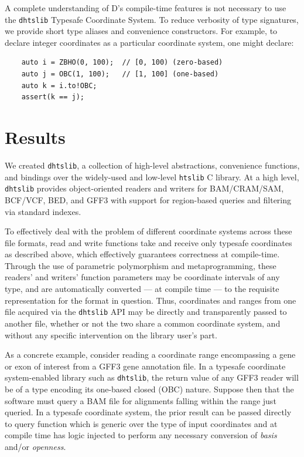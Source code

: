 \documentclass[12pt]{article}
\begin{document}
A complete understanding of D’s compile-time features is not necessary to use the \texttt{dhtslib} Typesafe Coordinate System. To reduce verbosity of type signatures, we provide short type aliases and convenience constructors. For example, to declare integer coordinates as a particular coordinate system, one might declare:

\begin{verbatim}
    auto i = ZBHO(0, 100);  // [0, 100) (zero-based)
    auto j = OBC(1, 100);   // [1, 100] (one-based)
    auto k = i.to!OBC;
    assert(k == j);
\end{verbatim}


\section*{Results}  %

We created \texttt{dhtslib},\cite{gregory_dhtslib_nodate} a collection of high-level abstractions, convenience functions, and bindings over the widely-used and low-level \texttt{htslib} C library.\cite{bonfield_htslib_2021} At a high level, \texttt{dhtslib} provides object-oriented readers and writers for BAM/CRAM/SAM, BCF/VCF, BED, and GFF3 with support for region-based queries and filtering via standard indexes.

To effectively deal with the problem of different coordinate systems across these file formats, read and write functions take and receive only typesafe coordinates as described above, which effectively guarantees correctness at compile-time. Through the use of parametric polymorphism and metaprogramming, these readers’ and writers’ function parameters may be coordinate intervals of any type, and are automatically converted --- at compile time --- to the requisite representation for the format in question. Thus, coordinates and ranges from one file acquired via the \texttt{dhtslib} API may be directly and transparently passed to another file, whether or not the two share a common coordinate system, and without any specific intervention on the library user's part.

As a concrete example, consider reading a coordinate range encompassing a gene or exon of interest from a GFF3 gene annotation file. In a typesafe coordinate system-enabled library such as \texttt{dhtslib}, the return value of any GFF3 reader will be of a type encoding its one-based closed (OBC) nature. Suppose then that the software must query a BAM file for alignments falling within the range just queried. In a typesafe coordinate system, the prior result can be passed directly to query function which is generic over the type of input coordinates and at compile time has logic injected to perform any necessary conversion of \textit{basis} and/or \textit{openness}. 
\end{document}
